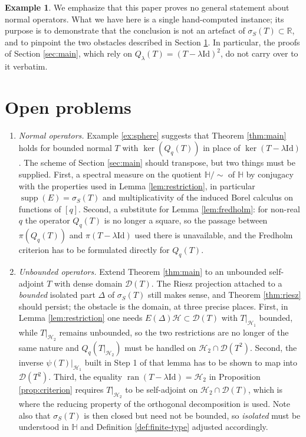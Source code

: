 \documentclass[12pt,a4paper]{article}
\theoremstyle{plain}
\theoremstyle{definition}
\newtheorem{example}[theorem]{Example}
\theoremstyle{remark}
\newcommand{\HH}{\mathbb H}
\newcommand{\RR}{\mathbb R}
\newcommand{\Id}{\mathrm{Id}}
\newcommand{\HS}{\mathcal H}
\newcommand{\sigS}{\sigma_S}
\DeclareMathOperator{\ran}{ran}
\DeclareMathOperator{\supp}{supp}
\begin{document}
{\begin{example}
We emphasize that this paper proves no general statement about
normal operators. What we have here is a single hand-computed
instance; its purpose is to demonstrate that the conclusion is not an
artefact of $\sigS(T)\subset\RR$, and to pinpoint the two obstacles
described in Section \ref{sec:conclusion}. In particular, the proofs
of Section \ref{sec:main}, which rely on
$Q_\lambda(T)=(T-\lambda\Id)^2$, do not carry over to it verbatim.
\end{example}

\section{Open problems}
\label{sec:conclusion}

\begin{enumerate}[leftmargin=2.4em]
\item \emph{Normal operators.} Example \ref{ex:sphere} suggests that
Theorem \ref{thm:main} holds for bounded normal $T$ with
$\ker(Q_q(T))$ in place of $\ker(T-\lambda\Id)$. The scheme of Section
\ref{sec:main} should transpose, but two things must be supplied.
First, a spectral measure on the quotient $\HH/\!\!\sim$ of $\HH$ by
conjugacy with the properties used in Lemma \ref{lem:restriction},
in particular $\supp(E)=\sigS(T)$ and multiplicativity of the induced
Borel calculus on functions of $[q]$. Second, a substitute for Lemma
\ref{lem:fredholm}: for non-real $q$ the operator $Q_q(T)$ is no
longer a square, so the passage between $\pi(Q_q(T))$ and
$\pi(T-\lambda\Id)$ used there is unavailable, and the Fredholm
criterion has to be formulated directly for $Q_q(T)$.
\item \emph{Unbounded operators.} Extend Theorem \ref{thm:main} to
an unbounded self-adjoint $T$ with dense domain $\mathcal D(T)$. The
Riesz projection attached to a \emph{bounded} isolated part $\Delta$
of $\sigS(T)$ still makes sense, and Theorem \ref{thm:riesz} should
persist; the obstacle is the domain, at three precise places. First,
in Lemma \ref{lem:restriction} one needs $E(\Delta)\HS\subset
\mathcal D(T)$ with $T|_{\HS_1}$ bounded, while $T|_{\HS_2}$ remains
unbounded, so the two restrictions are no longer of the same nature
and $Q_q(T|_{\HS_2})$ must be handled on
$\HS_2\cap\mathcal D(T^2)$. Second, the inverse
$\psi(T)|_{\HS_1}$ built in Step 1 of that lemma has to be shown to
map into $\mathcal D(T^2)$. Third, the equality
$\ran(T-\lambda\Id)=\HS_2$ in Proposition \ref{prop:criterion}
requires $T|_{\HS_2}$ to be self-adjoint on
$\HS_2\cap\mathcal D(T)$, which is where the reducing property of the
orthogonal decomposition is used. Note also that $\sigS(T)$ is then
closed but need not be bounded, so \emph{isolated} must be understood
in $\HH$ and Definition \ref{def:finite-type} adjusted accordingly.
\end{enumerate}

}
\end{document}
